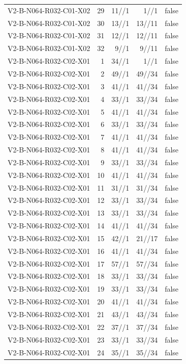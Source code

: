 {\begin{longtable}{lrrrr}
V2-B-N064-R032-C01-X02 & 29 & 11//1 & 1//1 & false \\
V2-B-N064-R032-C01-X02 & 30 & 13//1 & 13//11 & false \\
V2-B-N064-R032-C01-X02 & 31 & 12//1 & 12//11 & false \\
V2-B-N064-R032-C01-X02 & 32 & 9//1 & 9//11 & false \\
V2-B-N064-R032-C02-X01 & 1 & 34//1 & 1//1 & false \\
V2-B-N064-R032-C02-X01 & 2 & 49//1 & 49//34 & false \\
V2-B-N064-R032-C02-X01 & 3 & 41//1 & 41//34 & false \\
V2-B-N064-R032-C02-X01 & 4 & 33//1 & 33//34 & false \\
V2-B-N064-R032-C02-X01 & 5 & 41//1 & 41//34 & false \\
V2-B-N064-R032-C02-X01 & 6 & 33//1 & 33//34 & false \\
V2-B-N064-R032-C02-X01 & 7 & 41//1 & 41//34 & false \\
V2-B-N064-R032-C02-X01 & 8 & 41//1 & 41//34 & false \\
V2-B-N064-R032-C02-X01 & 9 & 33//1 & 33//34 & false \\
V2-B-N064-R032-C02-X01 & 10 & 41//1 & 41//34 & false \\
V2-B-N064-R032-C02-X01 & 11 & 31//1 & 31//34 & false \\
V2-B-N064-R032-C02-X01 & 12 & 33//1 & 33//34 & false \\
V2-B-N064-R032-C02-X01 & 13 & 33//1 & 33//34 & false \\
V2-B-N064-R032-C02-X01 & 14 & 41//1 & 41//34 & false \\
V2-B-N064-R032-C02-X01 & 15 & 42//1 & 21//17 & false \\
V2-B-N064-R032-C02-X01 & 16 & 41//1 & 41//34 & false \\
V2-B-N064-R032-C02-X01 & 17 & 57//1 & 57//34 & false \\
V2-B-N064-R032-C02-X01 & 18 & 33//1 & 33//34 & false \\
V2-B-N064-R032-C02-X01 & 19 & 33//1 & 33//34 & false \\
V2-B-N064-R032-C02-X01 & 20 & 41//1 & 41//34 & false \\
V2-B-N064-R032-C02-X01 & 21 & 43//1 & 43//34 & false \\
V2-B-N064-R032-C02-X01 & 22 & 37//1 & 37//34 & false \\
V2-B-N064-R032-C02-X01 & 23 & 33//1 & 33//34 & false \\
V2-B-N064-R032-C02-X01 & 24 & 35//1 & 35//34 & false \\

\end{longtable}}
